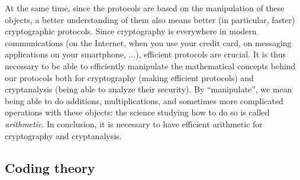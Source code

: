 At the same time, since the protocols are based on the manipulation of these
objects, a better understanding of them also means better (in particular,
faster) cryptographic protocols. Since cryptography is everywhere in modern
communications (on the Internet, when you use your credit card, on messaging
applications on your smartphone, ...), efficient protocols are crucial. It is
thus necessary to be able to efficiently manipulate the mathematical concepts
behind our protocols both for cryptography (making efficient protocols) and
cryptanalysis (being able to analyze their security). By ``manipulate'', we mean
being able to do additions, multiplications, and sometimes more complicated
operations with these objects: the science studying how to do so is called
\emph{arithmetic}. In conclusion, it is necessary to have efficient arithmetic
for cryptography and cryptanalysis.

\subsection{Coding theory}
\label{sec:coding}

